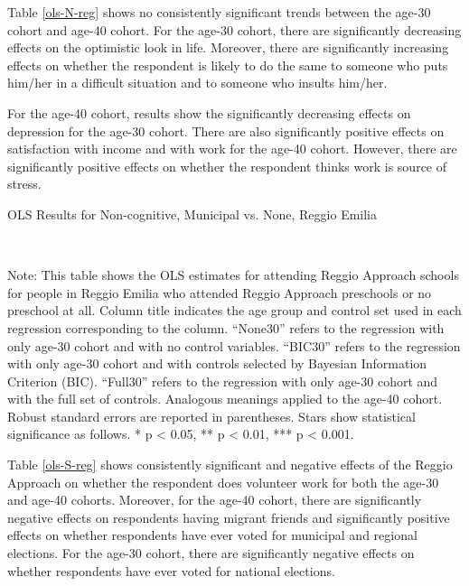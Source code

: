 Table \ref{ols-N-reg} shows no consistently significant trends between the age-30 cohort and age-40 cohort. For the age-30 cohort, there are significantly decreasing effects on the optimistic look in life. Moreover, there are significantly increasing effects on whether the respondent is likely to do the same to someone who puts him/her in a difficult situation and to someone who insults him/her.

For the age-40 cohort, results show the significantly decreasing effects on depression for the age-30 cohort. There are also significantly positive effects on satisfaction with income and with work for the age-40 cohort. However, there are significantly positive effects on whether the respondent thinks work is source of stress. 

\begin{table}[H] \caption{OLS Results for Non-cognitive, Municipal vs. None, Reggio Emilia} \label{ols-N-reg}

\vspace{1ex} \\
\footnotesize\raggedright{Note: This table shows the OLS estimates for attending Reggio Approach schools for people in Reggio Emilia who attended Reggio Approach preschools or no preschool at all. Column title indicates the age group and control set used in each regression corresponding to the column. ``None30'' refers to the regression with only age-30 cohort and with no control variables. ``BIC30'' refers to the regression with only age-30 cohort and with controls selected by Bayesian Information Criterion (BIC). ``Full30'' refers to the regression with only age-30 cohort and with the full set of controls. Analogous meanings applied to the age-40 cohort. Robust standard errors are reported in parentheses. Stars show statistical significance as follows. * p < 0.05, ** p < 0.01, *** p < 0.001.}
\end{table}

Table \ref{ols-S-reg} shows consistently significant and negative effects of the Reggio Approach on whether the respondent does volunteer work for both the age-30 and age-40 cohorts. Moreover, for the age-40 cohort, there are significantly negative effects on respondents having migrant friends and significantly positive effects on whether respondents have ever voted for municipal and regional elections. For the age-30 cohort, there are significantly negative effects on whether respondents have ever voted for national elections.

